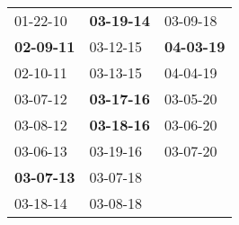 \begin{supertabular}{p{0.33\columnwidth}p{0.33\columnwidth}p{0.33\columnwidth}}
          01-22-10\textsuperscript{} &  \textbf{03-19-14\textsuperscript{}} &           03-09-18\textsuperscript{} \\
 \textbf{02-09-11\textsuperscript{}} &           03-12-15\textsuperscript{} &  \textbf{04-03-19\textsuperscript{}} \\
          02-10-11\textsuperscript{} &           03-13-15\textsuperscript{} &           04-04-19\textsuperscript{} \\
          03-07-12\textsuperscript{} &  \textbf{03-17-16\textsuperscript{}} &           03-05-20\textsuperscript{} \\
          03-08-12\textsuperscript{} &  \textbf{03-18-16\textsuperscript{}} &           03-06-20\textsuperscript{} \\
          03-06-13\textsuperscript{} &           03-19-16\textsuperscript{} &           03-07-20\textsuperscript{} \\
 \textbf{03-07-13\textsuperscript{}} &           03-07-18\textsuperscript{} &                                      \\
          03-18-14\textsuperscript{} &           03-08-18\textsuperscript{} &                                      \\
\end{supertabular}
